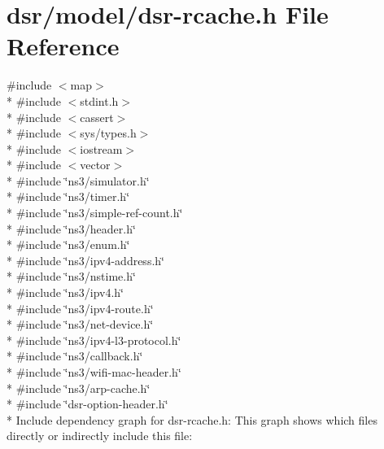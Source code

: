 \hypertarget{dsr-rcache_8h}{}\section{dsr/model/dsr-\/rcache.h File Reference}
\label{dsr-rcache_8h}
{\ttfamily \#include $<$map$>$}\\*
{\ttfamily \#include $<$stdint.\+h$>$}\\*
{\ttfamily \#include $<$cassert$>$}\\*
{\ttfamily \#include $<$sys/types.\+h$>$}\\*
{\ttfamily \#include $<$iostream$>$}\\*
{\ttfamily \#include $<$vector$>$}\\*
{\ttfamily \#include \char`\"{}ns3/simulator.\+h\char`\"{}}\\*
{\ttfamily \#include \char`\"{}ns3/timer.\+h\char`\"{}}\\*
{\ttfamily \#include \char`\"{}ns3/simple-\/ref-\/count.\+h\char`\"{}}\\*
{\ttfamily \#include \char`\"{}ns3/header.\+h\char`\"{}}\\*
{\ttfamily \#include \char`\"{}ns3/enum.\+h\char`\"{}}\\*
{\ttfamily \#include \char`\"{}ns3/ipv4-\/address.\+h\char`\"{}}\\*
{\ttfamily \#include \char`\"{}ns3/nstime.\+h\char`\"{}}\\*
{\ttfamily \#include \char`\"{}ns3/ipv4.\+h\char`\"{}}\\*
{\ttfamily \#include \char`\"{}ns3/ipv4-\/route.\+h\char`\"{}}\\*
{\ttfamily \#include \char`\"{}ns3/net-\/device.\+h\char`\"{}}\\*
{\ttfamily \#include \char`\"{}ns3/ipv4-\/l3-\/protocol.\+h\char`\"{}}\\*
{\ttfamily \#include \char`\"{}ns3/callback.\+h\char`\"{}}\\*
{\ttfamily \#include \char`\"{}ns3/wifi-\/mac-\/header.\+h\char`\"{}}\\*
{\ttfamily \#include \char`\"{}ns3/arp-\/cache.\+h\char`\"{}}\\*
{\ttfamily \#include \char`\"{}dsr-\/option-\/header.\+h\char`\"{}}\\*
Include dependency graph for dsr-\/rcache.h\+:
This graph shows which files directly or indirectly include this file\+:
